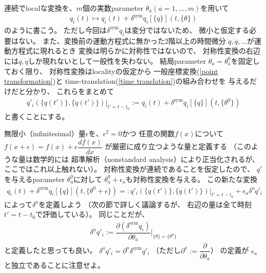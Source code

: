 連続でlocalな変換を、$m$個の実数parameter
$\theta_a (a=1,\dots,m)$を用いて
\begin{align}
  q_i(t) \mapsto q_i(t) +
  \delta^{\mathrm{sym}} q_i[\{ q \}] (t, \{\theta\})
\end{align}
のように書こう。
ただし今回は$\delta^{\mathrm{sym}} q_i$は変分ではないため、
微小と仮定する必要はない。
また、変換前の運動方程式に無かった2階以上の時間微分
$\ddot{q}, \dddot{q},\dots$が運動方程式に現れるとき
変換は明らかに対称性ではないので、
対称性変換の右辺には$q, \dot{q}$しか現れないとして一般性を失わない。
結局parameter $\theta_a = \theta_a^0$を固定しておく限り、
対称性変換はlocalityの仮定から
一般座標変換(\ref{point transformation})と
time-translation(\ref{time translation})の組み合わせを
与えるだけだと分かり、
これらをまとめて
\begin{align}
  q'_i( \{ q(t') \}, \{ \dot{q}(t') \} )
    \Big|_{t' = t - t_0}
  := q_i(t) +
  \delta^{\mathrm{sym}} q_i[\{ q \}] (t, \{\theta^0\})
\end{align}
と書くことにする。

無限小（infinitesimal）量$\epsilon$を、$\epsilon^2 = 0$かつ
任意の関数$f(x)$について
$f(x+\epsilon)=f(x) + \epsilon \dfrac{df(x)}{dx}$
が厳密に成り立つような量と定義する
（このような量は数学的には
超準解析（nonstandard analysis）により正当化されるが、
ここではこれ以上触れない）。
対称性変換が連続であることを仮定したので、
$q'$を与えるparameter $\theta_a^0$に対して
$\theta_a^0 + \epsilon_a$も対称性変換を与える。
この新たな変換
\begin{align}
  q_i(t) +
  \delta^{\mathrm{sym}} q_i[\{ q \}] (t, \{\theta^0 + \epsilon\})
  =:
  q'_i( \{ q(t') \}, \{ \dot{q}(t') \} )
    \Big|_{t' = t - t_0}
  + \epsilon_a \delta^a q'_i
\end{align}
によって$\delta^a$を定義しよう
（次の節で詳しく議論するが、
右辺の量は全て時刻$t' = t - t_0$で評価している）。
同じことだが、
\begin{align}
  \delta^a q'_i :=
  \dfrac{\partial
    (\delta^{\mathrm{sym}} q_i)
  }{
    \partial \theta_a
  }
  \Bigg|_{\{\theta\} = \{\theta^0\}}
\end{align}
と定義したと思っても良い。
$\delta^a q'_i
= \partial^a \delta^{\mathrm{sym}} q'_i$
（ただし$\partial^a := \dfrac{\partial}{\partial \theta_a}$）
の定義が
$\epsilon_a$と独立であることに注意せよ。

